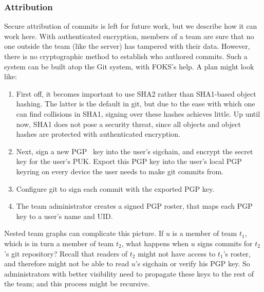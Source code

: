 \subsubsection{Attribution}

Secure attribution of commits is left for future work, but we describe how it
can work here. With authenticated encryption, members of a team are sure that no
one outside the team (like the server) has tampered with their data. However,
there is no cryptographic method to establish who authored commits. Such a
system can be built atop the Git system, with FOKS's help. A plan might look like:

\begin{enumerate}

    \item
First off, it
becomes important to use SHA2 rather than SHA1-based object hashing. The latter
is the default in git, but due to the ease with which one can find collisions
in SHA1, signing over these hashes achieves little. Up until now, SHA1 does
not pose a security threat, since all objects and object hashes are protected
with authenticated encryption.

    \item Next, sign a new PGP~\cite{pgp} key into the user's sigchain,
      and encrypt the secret key for the user's PUK. Export this PGP
      key into the user's local PGP keyring on every device the user
      needs to make git commits from.

    \item Configure git to sign each commit with the exported PGP key.

    \item The team administrator creates a signed PGP roster, that maps
      each PGP key to a user's name and UID.

\end{enumerate}

Nested team graphs can complicate this picture. If $u$ is a member of team $t_1$,
which is in turn a member of team $t_2$, what happens when $u$ signs commits
for $t_2$'s git repository? Recall that readers of $t_2$ might not have access 
to $t_1$'s roster, and therefore might not be able to read $u$'s sigchain
or verify his PGP key. So administrators with better visibility need
to propagate these keys to the rest of the team; and this process 
might be recursive.